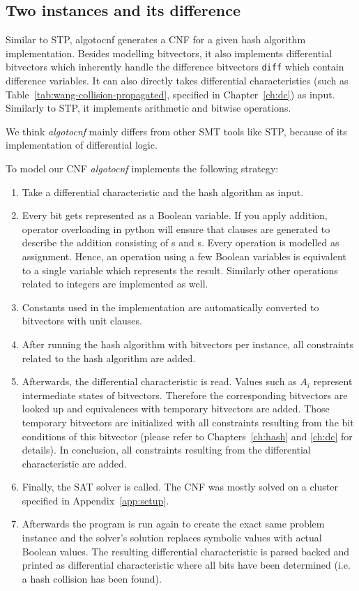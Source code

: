 \subsection{Two instances and its difference}
\label{sec:enc-original}
%
Similar to STP, algotocnf generates a CNF for a given hash algorithm implementation.
Besides modelling bitvectors, it also implements differential bitvectors which
inherently handle the difference bitvectors \texttt{diff} which contain difference
variables. It can also directly takes differential characteristics (such as
Table~\ref{tab:wang-collision-propagated}, specified in Chapter~\ref{ch:dc})
as input. Similarly to STP, it implements arithmetic and bitwise operations.

We think \emph{algotocnf} mainly differs from other SMT tools like STP,
because of its implementation of differential logic.

To model our CNF \emph{algotocnf} implements the following strategy:
\begin{enumerate}
  \item Take a differential characteristic and the hash algorithm as input.
  \item Every bit gets represented as a Boolean variable.
    If you apply addition, operator overloading in python will ensure
    that clauses are generated to describe the addition consisting of
    s and s. Every operation is modelled as assignment.
    Hence, an operation using a few Boolean variables is equivalent
    to a single variable which represents the result.
    Similarly other operations related to integers are implemented as well.
  \item Constants used in the implementation are automatically converted
    to bitvectors with unit clauses.
  \item After running the hash algorithm with bitvectors per instance,
    all constraints related to the hash algorithm are added.
  \item Afterwards, the differential characteristic is read. Values such as $A_i$
    represent intermediate states of bitvectors. Therefore the corresponding bitvectors
    are looked up and equivalences with temporary bitvectors are added.
    Those temporary bitvectors are initialized with all constraints resulting from
    the bit conditions of this bitvector (please refer to Chapters~\ref{ch:hash}
    and \ref{ch:dc} for details).
    In conclusion, all constraints resulting from the differential characteristic are added.
  \item Finally, the SAT solver is called. The CNF was mostly solved on a cluster
    specified in Appendix~\ref{app:setup}.
  \item Afterwards the program is run again to
    create the exact same problem instance and the solver's solution replaces
    symbolic values with actual Boolean values. The resulting differential
    characteristic is parsed backed and printed as differential characteristic
    where all bits have been determined (i.e. a hash collision has been found).
\end{enumerate}

